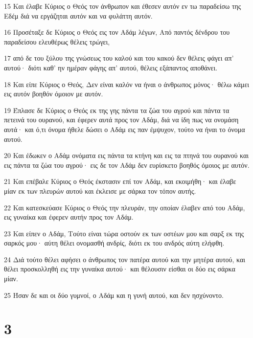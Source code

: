 \par 15 Και έλαβε Κύριος ο Θεός τον άνθρωπον και έθεσεν αυτόν εν τω παραδείσω της Εδέμ διά να εργάζηται αυτόν και να φυλάττη αυτόν.
\par 16 Προσέταξε δε Κύριος ο Θεός εις τον Αδάμ λέγων, Από παντός δένδρου του παραδείσου ελευθέρως θέλεις τρώγει,
\par 17 από δε του ξύλου της γνώσεως του καλού και του κακού δεν θέλεις φάγει απ' αυτού· διότι καθ' ην ημέραν φάγης απ' αυτού, θέλεις εξάπαντος αποθάνει.
\par 18 Και είπε Κύριος ο Θεός, Δεν είναι καλόν να ήναι ο άνθρωπος μόνος· θέλω κάμει εις αυτόν βοηθόν όμοιον με αυτόν.
\par 19 Έπλασε δε Κύριος ο Θεός εκ της γης πάντα τα ζώα του αγρού και πάντα τα πετεινά του ουρανού, και έφερεν αυτά προς τον Αδάμ, διά να ίδη πως να ονομάση αυτά· και ό,τι όνομα ήθελε δώσει ο Αδάμ εις παν έμψυχον, τούτο να ήναι το όνομα αυτού.
\par 20 Και έδωκεν ο Αδάμ ονόματα εις πάντα τα κτήνη και εις τα πτηνά του ουρανού και εις πάντα τα ζώα του αγρού· εις δε τον Αδάμ δεν ευρίσκετο βοηθός όμοιος με αυτόν.
\par 21 Και επέβαλε Κύριος ο Θεός έκστασιν επί τον Αδάμ, και εκοιμήθη· και έλαβε μίαν εκ των πλευρών αυτού και έκλεισε με σάρκα τον τόπον αυτής.
\par 22 Και κατεσκεύασε Κύριος ο Θεός την πλευράν, την οποίαν έλαβεν από του Αδάμ, εις γυναίκα και έφερεν αυτήν προς τον Αδάμ.
\par 23 Και είπεν ο Αδάμ, Τούτο είναι τώρα οστούν εκ των οστέων μου και σαρξ εκ της σαρκός μου· αύτη θέλει ονομασθή ανδρίς, διότι εκ του ανδρός αύτη ελήφθη.
\par 24 Διά τούτο θέλει αφήσει ο άνθρωπος τον πατέρα αυτού και την μητέρα αυτού, και θέλει προσκολληθή εις την γυναίκα αυτού· και θέλουσιν είσθαι οι δύο εις σάρκα μίαν.
\par 25 Ήσαν δε και οι δύο γυμνοί, ο Αδάμ και η γυνή αυτού, και δεν ησχύνοντο.

\chapter{3}

